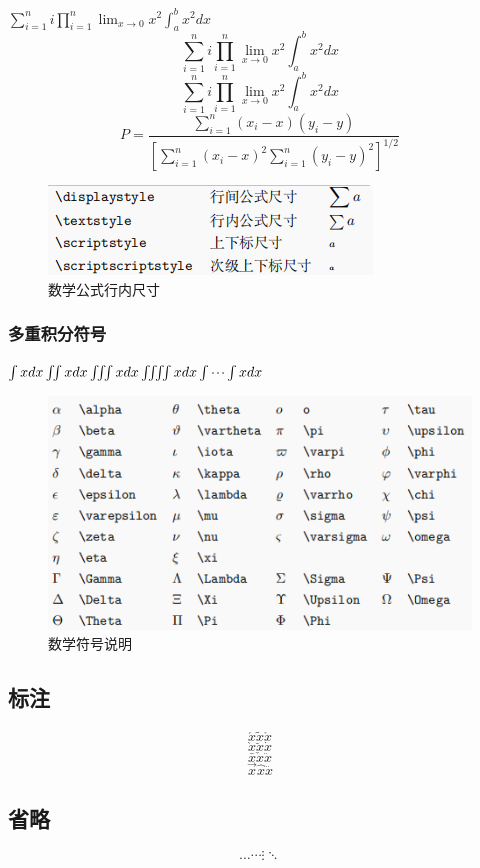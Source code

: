 \documentclass[12pt]{ctexart} %
\begin{document}
$ \sum_{i=1}^n i \prod_{i=1}^n \lim_{x\to0}x^2 \int_a^b x^2 dx $
$$ \sum_{i=1}^n i \prod_{i=1}^n \lim_{x\to0}x^2 \int_a^b x^2 dx $$
\[ \sum_{i=1}^n i \prod_{i=1}^n \lim_{x\to0}x^2 \int_a^b x^2 dx \]
\[
P = \frac
{\sum_{i=1}^n (x_i- x)(y_i- y)}
{\displaystyle \left[
\sum_{i=1}^n (x_i-x)^2
\sum_{i=1}^n (y_i-y)^2
\right]^{1/2} }
\]

\begin{figure}[htbp]
\centering
\includegraphics[scale=0.7]{figures/chicun.png}
	\caption{数学公式行内尺寸}
	\label{fig:chicun}
\end{figure}

\subsubsection{多重积分符号}
 $ \int x dx \iint x dx \iiint x dx \iiiint x dx \idotsint x dx $
 
\begin{figure}[htbp]
\centering
\includegraphics[scale=0.7]{figures/fuhao}
	\caption{数学符号说明}
	\label{fig:fuhao}
\end{figure}
	
 \subsection{标注}
$$\acute{x}  \tilde{x}  \mathring{x}$$
$$ \grave{x}  \breve{x}  \dot{x}$$
$$\bar{x}  \check{x}  \ddot{x}$$
$$ \vec{x}  \hat{x}  \dddot{x} $$
\subsection{省略}
\[ \dots \cdots \vdots \ddots \]
\end{document}
